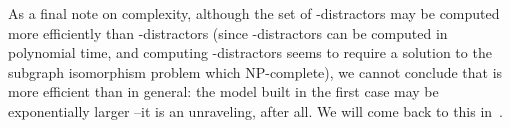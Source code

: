 %


As a final note on complexity, although the set of \EL-distractors
may be computed more efficiently than \EPFOL-distractors (since
\EL-distractors can be computed in polynomial time, and computing
\EPFOL-distractors seems to require a solution to the subgraph
isomorphism problem which NP-complete), we cannot conclude that
 is more efficient than  in
general: the model built in the first case may be exponentially
larger --it is an unraveling, after all. We will come back to this
in~.
